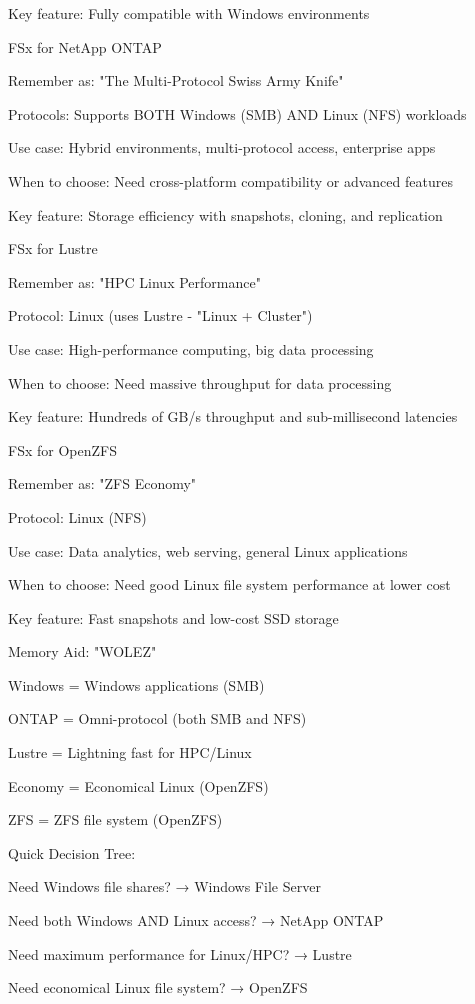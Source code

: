 \documentclass[11pt,a4paper]{report}
\begin{document}
Key feature: Fully compatible with Windows environments


FSx for NetApp ONTAP

Remember as: "The Multi-Protocol Swiss Army Knife"


Protocols: Supports BOTH Windows (SMB) AND Linux (NFS) workloads

Use case: Hybrid environments, multi-protocol access, enterprise apps

When to choose: Need cross-platform compatibility or advanced features

Key feature: Storage efficiency with snapshots, cloning, and replication


FSx for Lustre

Remember as: "HPC Linux Performance"


Protocol: Linux (uses Lustre - "Linux + Cluster")

Use case: High-performance computing, big data processing

When to choose: Need massive throughput for data processing

Key feature: Hundreds of GB/s throughput and sub-millisecond latencies


FSx for OpenZFS

Remember as: "ZFS Economy"


Protocol: Linux (NFS)

Use case: Data analytics, web serving, general Linux applications

When to choose: Need good Linux file system performance at lower cost

Key feature: Fast snapshots and low-cost SSD storage


Memory Aid: "WOLEZ"


Windows = Windows applications (SMB)

ONTAP = Omni-protocol (both SMB and NFS)

Lustre = Lightning fast for HPC/Linux

Economy = Economical Linux (OpenZFS)

ZFS = ZFS file system (OpenZFS)


Quick Decision Tree:


Need Windows file shares? → Windows File Server

Need both Windows AND Linux access? → NetApp ONTAP

Need maximum performance for Linux/HPC? → Lustre

Need economical Linux file system? → OpenZFS
\end{document}
